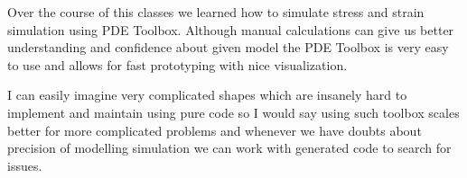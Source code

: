 \documentclass[12pt]{article}
\begin{document}
Over the course of this classes we learned how to simulate stress and strain simulation using PDE Toolbox. Although manual calculations can give us better understanding and confidence about given model the PDE Toolbox is very easy to use and allows for fast prototyping with nice visualization.

I can easily imagine very complicated shapes which are insanely hard to implement and maintain using pure code so I would say using such toolbox scales better for more complicated problems and whenever we have doubts about precision of modelling simulation we can work with generated code to search for issues.
\end{document}
